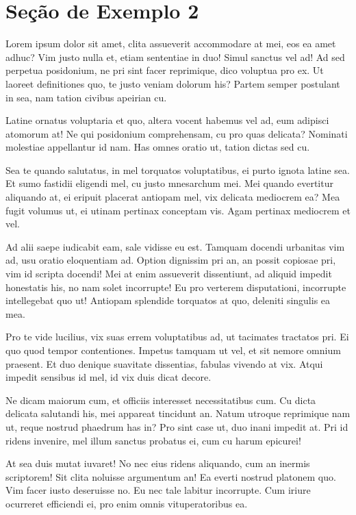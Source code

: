 \documentclass[
	12pt,				%
	openright,			%
	oneside,			%
	a4paper,			%
	english,			%
	french,				%
	spanish,			%
	brazil,				%
	]{abntex2}
\begin{document}
\section{Seção de Exemplo 2}
\label{sec: exemplo2}

Lorem ipsum dolor sit amet, clita assueverit accommodare at mei, eos ea amet adhuc? Vim justo nulla et, etiam sententiae in duo! Simul sanctus vel ad! Ad sed perpetua posidonium, ne pri sint facer reprimique, dico voluptua pro ex. Ut laoreet definitiones quo, te justo veniam dolorum his? Partem semper postulant in sea, nam tation civibus apeirian cu.

Latine ornatus voluptaria et quo, altera vocent habemus vel ad, eum adipisci atomorum at! Ne qui posidonium comprehensam, cu pro quas delicata? Nominati molestiae appellantur id nam. Has omnes oratio ut, tation dictas sed cu.

Sea te quando salutatus, in mel torquatos voluptatibus, ei purto ignota latine sea. Et sumo fastidii eligendi mel, cu justo mnesarchum mei. Mei quando evertitur aliquando at, ei eripuit placerat antiopam mel, vix delicata mediocrem ea? Mea fugit volumus ut, ei utinam pertinax conceptam vis. Agam pertinax mediocrem et vel.

Ad alii saepe iudicabit eam, sale vidisse eu est. Tamquam docendi urbanitas vim ad, usu oratio eloquentiam ad. Option dignissim pri an, an possit copiosae pri, vim id scripta docendi! Mei at enim assueverit dissentiunt, ad aliquid impedit honestatis his, no nam solet incorrupte! Eu pro verterem disputationi, incorrupte intellegebat quo ut! Antiopam splendide torquatos at quo, deleniti singulis ea mea.

Pro te vide lucilius, vix suas errem voluptatibus ad, ut tacimates tractatos pri. Ei quo quod tempor contentiones. Impetus tamquam ut vel, et sit nemore omnium praesent. Et duo denique suavitate dissentias, fabulas vivendo at vix. Atqui impedit sensibus id mel, id vix duis dicat decore.

Ne dicam maiorum cum, et officiis interesset necessitatibus cum. Cu dicta delicata salutandi his, mei appareat tincidunt an. Natum utroque reprimique nam ut, reque nostrud phaedrum has in? Pro sint case ut, duo inani impedit at. Pri id ridens invenire, mel illum sanctus probatus ei, cum cu harum epicurei!

At sea duis mutat iuvaret! No nec eius ridens aliquando, cum an inermis scriptorem! Sit clita noluisse argumentum an! Ea everti nostrud platonem quo. Vim facer iusto deseruisse no. Eu nec tale labitur incorrupte. Cum iriure ocurreret efficiendi ei, pro enim omnis vituperatoribus ea.
\end{document}
